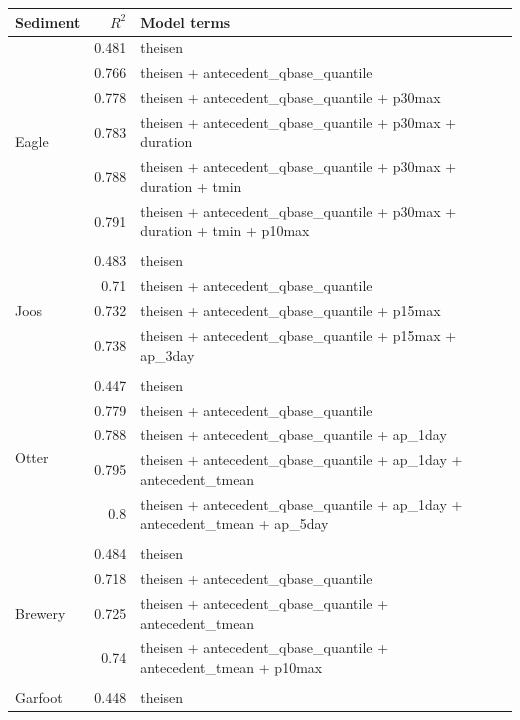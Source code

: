 \documentclass[10pt]{article}
\begin{document}
\begin{table}[h] \small
    \begin{center}
    \begin{tabular}{lrl}
    \textbf{Sediment} & $R^2$ & Model terms \\
    \hline
\multirow{7}{*}{Eagle} & 0.481 & theisen\\ 
 & 0.766 & theisen + antecedent\_qbase\_quantile\\ 
 & 0.778 & theisen + antecedent\_qbase\_quantile + p30max\\ 
 & 0.783 & theisen + antecedent\_qbase\_quantile + p30max + duration\\ 
 & 0.788 & theisen + antecedent\_qbase\_quantile + p30max + duration + tmin\\ 
 & 0.791 & theisen + antecedent\_qbase\_quantile + p30max + duration + tmin + p10max\\ 
\vspace{2mm}\\ \multirow{5}{*}{Joos} & 0.483 & theisen\\ 
 & 0.71 & theisen + antecedent\_qbase\_quantile\\ 
 & 0.732 & theisen + antecedent\_qbase\_quantile + p15max\\ 
 & 0.738 & theisen + antecedent\_qbase\_quantile + p15max + ap\_3day\\ 
\vspace{2mm}\\ \multirow{6}{*}{Otter} & 0.447 & theisen\\ 
 & 0.779 & theisen + antecedent\_qbase\_quantile\\ 
 & 0.788 & theisen + antecedent\_qbase\_quantile + ap\_1day\\ 
 & 0.795 & theisen + antecedent\_qbase\_quantile + ap\_1day + antecedent\_tmean\\ 
 & 0.8 & theisen + antecedent\_qbase\_quantile + ap\_1day + antecedent\_tmean + ap\_5day\\ 
\vspace{2mm}\\ \multirow{5}{*}{Brewery} & 0.484 & theisen\\ 
 & 0.718 & theisen + antecedent\_qbase\_quantile\\ 
 & 0.725 & theisen + antecedent\_qbase\_quantile + antecedent\_tmean\\ 
 & 0.74 & theisen + antecedent\_qbase\_quantile + antecedent\_tmean + p10max\\ 
\vspace{2mm}\\ \multirow{6}{*}{Garfoot} & 0.448 & theisen\\ 

\end{tabular}
\end{center}
\end{table}
\end{document}

